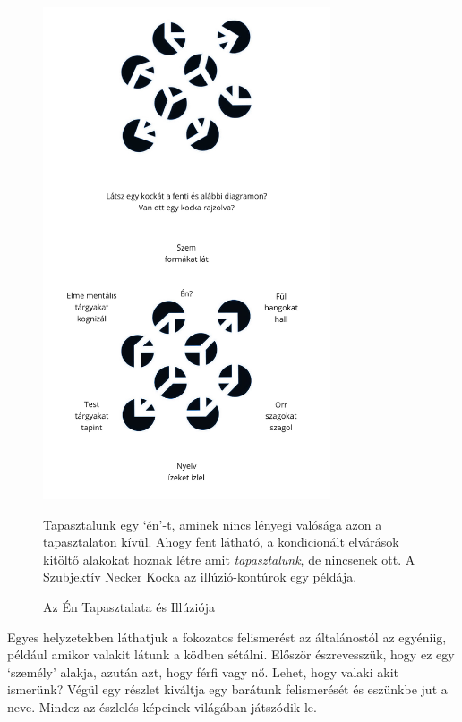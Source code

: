 \begin{figure}[h]
\vspace*{-15pt}
\caption{Az Én Tapasztalata és Illúziója}\label{fig-illusion-of-self}

\centering

\includegraphics[width=85mm]{./manuscript/tex/diagrams/senses-self-illusion-hu.pdf}

\begin{minipage}{0.85\linewidth}
\centering\footnotesize
Tapasztalunk egy `én'-t, aminek nincs lényegi valósága azon a tapasztalaton kívül.
Ahogy fent látható, a kondicionált elvárások kitöltő alakokat hoznak létre
amit \emph{tapasztalunk}, de nincsenek ott.
A Szubjektív Necker Kocka az illúzió-kontúrok egy példája.
\end{minipage}

\end{figure}

\clearpage
\normalpagelayout

Egyes helyzetekben láthatjuk a fokozatos felismerést az általánostól az
egyéniig, például amikor valakit látunk a ködben sétálni. Először
észrevesszük, hogy ez egy `személy' alakja, azután azt, hogy férfi vagy
nő. Lehet, hogy valaki akit ismerünk? Végül egy részlet kiváltja egy
barátunk felismerését és eszünkbe jut a neve. Mindez az észlelés
képeinek világában játszódik le.

